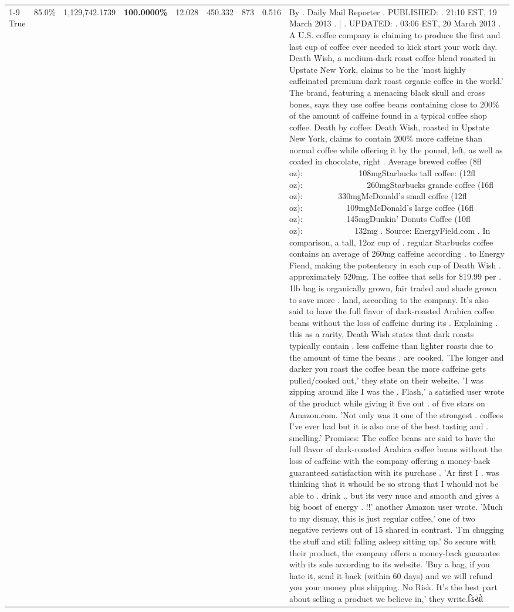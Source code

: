 \begin{table}[H]
{\begin{tabular}{lllrlllll}
\cline{1-9}
True & 85.0\% & 1,129,742.1739 & \bfseries \color{red} 100.0000\% & 12.028 & 450.332 & 873 & 0.516 & By . Daily Mail Reporter . PUBLISHED: . 21:10 EST, 19 March 2013 . | . UPDATED: . 03:06 EST, 20 March 2013 . A U.S. coffee company is claiming to produce the first and last cup of coffee ever needed to kick start your work day. Death Wish, a medium-dark roast coffee blend roasted in Upstate New York, claims to be the 'most highly caffeinated premium dark roast organic coffee in the world.' The brand, featuring a menacing black skull and cross bones, says they use coffee beans containing close to 200\% of the amount of caffeine found in a typical coffee shop coffee. Death by coffee: Death Wish, roasted in Upstate New York, claims to contain 200\% more caffeine than normal coffee while offering it by the pound, left, as well as coated in chocolate, right . Average brewed coffee (8fl oz):              108mgStarbucks tall coffee: (12fl oz):                260mgStarbucks grande coffee (16fl oz):         330mgMcDonald's small coffee (12fl oz):           109mgMcDonald's large coffee (16fl oz):           145mgDunkin' Donuts Coffee (10fl oz):             132mg . Source: EnergyField.com . In comparison, a tall, 12oz cup of . regular Starbucks coffee contains an average of 260mg caffeine according . to Energy Fiend, making the potentency in each cup of Death Wish . approximately 520mg. The coffee that sells for \$19.99 per . 1lb bag is organically grown, fair traded and shade grown to save more . land, according to the company. It's also said to have the full flavor of dark-roasted Arabica coffee beans without the loss of caffeine during its . Explaining . this as a rarity, Death Wish states that dark roasts typically contain . less caffeine than lighter roasts due to the amount of time the beans . are cooked. 'The longer and darker you roast the coffee bean the more caffeine gets pulled/cooked out,' they state on their website. 'I was zipping around like I was the . Flash,' a satisfied user wrote of the product while giving it five out . of five stars on Amazon.com. 'Not only was it one of the strongest . coffees I've ever had but it is also one of the best tasting and . smelling.’ Promises: The coffee beans are said to have the full flavor of dark-roasted Arabica coffee beans without the loss of caffeine with the company offering a money-back guaranteed satisfaction with its purchase . 'Ar first I . was thinking that it whould be so strong that I whould not be able to . drink .. but its very nuce and smooth and gives a big boost of energy . !!' another Amazon user wrote. 'Much to my dismay, this is just regular coffee,' one of two negative reviews out of 15 shared in contrast. 'I'm chugging the stuff and still falling asleep sitting up.' So secure with their product, the company offers a money-back guarantee with its sale according to its website. 'Buy a bag, if you hate it, send it back (within 60 days) and we will refund you your money plus shipping. No Risk. It’s the best part about selling a product we believe in,' they write.ડિયો \\

\end{tabular}}
\end{table}
